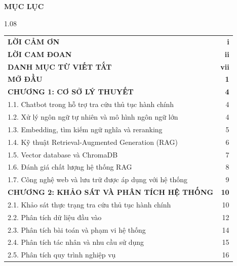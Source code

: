 \begin{center}\Large\bfseries MỤC LỤC\end{center}
\vspace{0.3cm}
\begin{spacing}{1.08}
\begin{longtable}{@{}p{}r@{}}
\textbf{LỜI CẢM ƠN} & \textbf{i}\\
\textbf{LỜI CAM ĐOAN} & \textbf{ii}\\
\textbf{DANH MỤC TỪ VIẾT TẮT} & \textbf{vii}\\
\textbf{MỞ ĐẦU} & \textbf{1}\\
\textbf{CHƯƠNG 1: CƠ SỞ LÝ THUYẾT} & \textbf{4}\\
\hspace*{0.35cm} 1.1. Chatbot trong hỗ trợ tra cứu thủ tục hành chính & 4\\
\hspace*{0.35cm} 1.2. Xử lý ngôn ngữ tự nhiên và mô hình ngôn ngữ lớn & 4\\
\hspace*{0.35cm} 1.3. Embedding, tìm kiếm ngữ nghĩa và reranking & 5\\
\hspace*{0.35cm} 1.4. Kỹ thuật Retrieval-Augmented Generation (RAG) & 6\\
\hspace*{0.35cm} 1.5. Vector database và ChromaDB & 7\\
\hspace*{0.35cm} 1.6. Đánh giá chất lượng hệ thống RAG & 8\\
\hspace*{0.35cm} 1.7. Công nghệ web và lưu trữ được áp dụng với hệ thống & 9\\
\textbf{CHƯƠNG 2: KHẢO SÁT VÀ PHÂN TÍCH HỆ THỐNG} & \textbf{10}\\
\hspace*{0.35cm} 2.1. Khảo sát thực trạng tra cứu thủ tục hành chính & 10\\
\hspace*{0.35cm} 2.2. Phân tích dữ liệu đầu vào & 12\\
\hspace*{0.35cm} 2.3. Phân tích bài toán và phạm vi hệ thống & 14\\
\hspace*{0.35cm} 2.4. Phân tích tác nhân và nhu cầu sử dụng & 15\\
\hspace*{0.35cm} 2.5. Phân tích quy trình nghiệp vụ & 16\\

\end{longtable}
\end{spacing}

